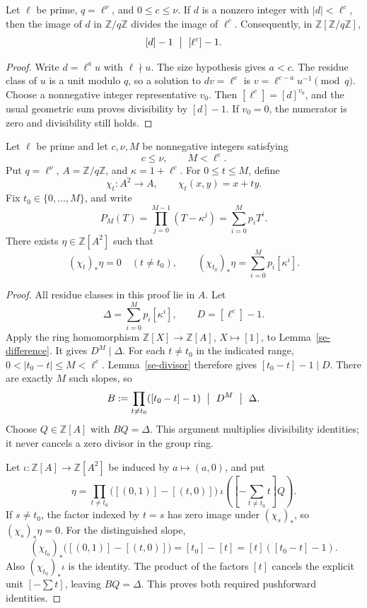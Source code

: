 \begin{lemma}\label{se-divisor}
Let \(\ell\) be prime, \(q=\ell^\nu\), and
\(0\le c\le\nu\).
If \(d\) is a nonzero integer with \(|d|<\ell^c\),
then the image of \(d\) in \(\mathbb Z/q\mathbb Z\)
divides the image of \(\ell^c\).
Consequently, in \(\mathbb Z[\mathbb Z/q\mathbb Z]\),
\[
                  [d]-1\ \bigm|\ [\ell^c]-1.
\]
\end{lemma}
\begin{proof}
Write \(d=\ell^a u\) with \(\ell\nmid u\).
The size hypothesis gives \(a<c\).
The residue class of \(u\) is a unit modulo \(q\),
so a solution to \(dv=\ell^c\) is
\(v=\ell^{c-a}u^{-1}\pmod q\).
Choose a nonnegative integer representative \(v_0\).
Then \([\ell^c]=[d]^{v_0}\), and the usual geometric
sum proves divisibility by \([d]-1\).
If \(v_0=0\), the numerator is zero and divisibility
still holds.
\end{proof}

\begin{theorem}\label{se-interpolation}
Let \(\ell\) be prime and let \(c,\nu,M\) be
nonnegative integers satisfying
\[
                 c\le\nu,\qquad M<\ell^c.
\]
Put \(q=\ell^\nu\), \(A=\mathbb Z/q\mathbb Z\),
and \(\kappa=1+\ell^c\).
For \(0\le t\le M\), define
\[
             \chi_t:A^2\longrightarrow A,
             \qquad \chi_t(x,y)=x+ty.
\]
Fix \(t_0\in\{0,\ldots,M\}\), and write
\[
              P_M(T)=\prod_{j=0}^{M-1}(T-\kappa^j)
                       =\sum_{i=0}^Mp_iT^i.
\]
There exists \(\eta\in\mathbb Z[A^2]\) such that
\[
  (\chi_t)_*\eta=0\quad(t\ne t_0),
  \qquad
  (\chi_{t_0})_*\eta
                       =\sum_{i=0}^M p_i[\kappa^i].
\]
\end{theorem}
\begin{proof}
All residue classes in this proof lie in \(A\).
Let
\[
          \Delta=\sum_{i=0}^Mp_i[\kappa^i],
          \qquad D=[\ell^c]-1.
\]
Apply the ring homomorphism
\(\mathbb Z[X]\to\mathbb Z[A]\), \(X\mapsto[1]\),
to Lemma~\ref{se-difference}.
It gives \(D^M\mid\Delta\).
For each \(t\ne t_0\) in the indicated range,
\(0<|t_0-t|\le M<\ell^c\).
Lemma~\ref{se-divisor} therefore gives
\([t_0-t]-1\mid D\).
There are exactly \(M\) such slopes, so
\[
          B:=\prod_{t\ne t_0}([t_0-t]-1)
                      \ \bigm|\ D^M\ \bigm|\ \Delta.
\]
Choose \(Q\in\mathbb Z[A]\) with \(BQ=\Delta\).
This argument multiplies divisibility identities;
it never cancels a zero divisor in the group ring.

Let \(\iota:\mathbb Z[A]\to\mathbb Z[A^2]\)
be induced by \(a\mapsto(a,0)\), and put
\[
 \eta=
 \prod_{t\ne t_0}\bigl([(0,1)]-[(t,0)]\bigr)
 \ \iota\!\left(\left[-\sum_{t\ne t_0}t\right]Q\right).
\]
If \(s\ne t_0\), the factor indexed by \(t=s\)
has zero image under \((\chi_s)_*\), so
\((\chi_s)_*\eta=0\).
For the distinguished slope,
\[
 (\chi_{t_0})_*\bigl([(0,1)]-[(t,0)]\bigr)
       =[t_0]-[t]=[t]([t_0-t]-1).
\]
Also \((\chi_{t_0})_*\iota\) is the identity.
The product of the factors \([t]\) cancels the
explicit unit \([-\sum t]\), leaving \(BQ=\Delta\).
This proves both required pushforward identities.
\end{proof}

